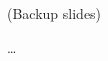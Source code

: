 \documentclass{beamer}
\begin{document}
\begin{frame}

\begin{center}
\large{(Backup slides)}
\end{center}

\end{frame}

\begin{frame}
  \ldots
\end{frame}
\end{document}
